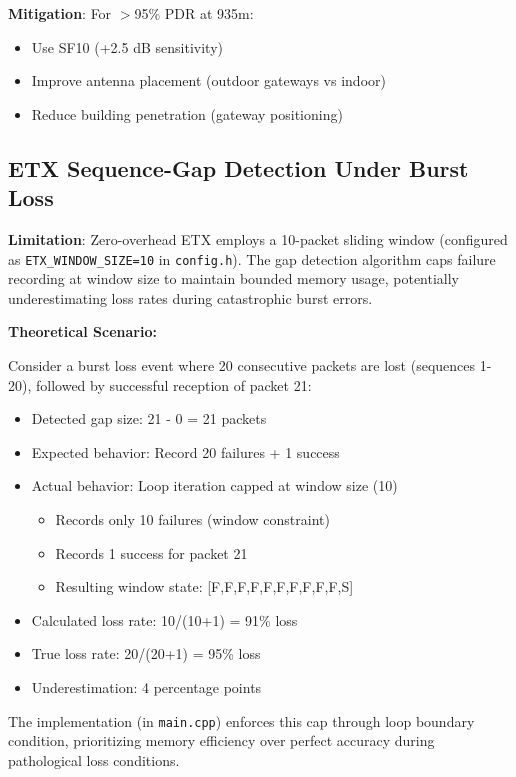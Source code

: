 \textbf{Mitigation}: For $>$95\% PDR at 935m:
\begin{itemize}
\item Use SF10 (+2.5 dB sensitivity)
\item Improve antenna placement (outdoor gateways vs indoor)
\item Reduce building penetration (gateway positioning)
\end{itemize}

\subsection{ETX Sequence-Gap Detection Under Burst Loss}

\textbf{Limitation}: Zero-overhead ETX employs a 10-packet sliding window (configured as \texttt{ETX\_WINDOW\_SIZE=10} in \texttt{config.h}). The gap detection algorithm caps failure recording at window size to maintain bounded memory usage, potentially underestimating loss rates during catastrophic burst errors.

\textbf{Theoretical Scenario:}

Consider a burst loss event where 20 consecutive packets are lost (sequences 1-20), followed by successful reception of packet 21:

\begin{itemize}
\item Detected gap size: 21 - 0 = 21 packets
\item Expected behavior: Record 20 failures + 1 success
\item Actual behavior: Loop iteration capped at window size (10)
  \begin{itemize}
  \item Records only 10 failures (window constraint)
  \item Records 1 success for packet 21
  \item Resulting window state: [F,F,F,F,F,F,F,F,F,F,S]
  \end{itemize}
\item Calculated loss rate: 10/(10+1) = 91\% loss
\item True loss rate: 20/(20+1) = 95\% loss
\item Underestimation: 4 percentage points
\end{itemize}

The implementation (in \texttt{main.cpp}) enforces this cap through loop boundary condition, prioritizing memory efficiency over perfect accuracy during pathological loss conditions.

